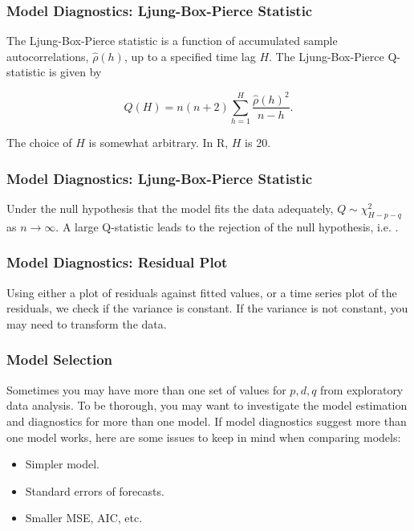 \documentclass[%
xcolor=pdftex]{beamer}
\begin{document}
\begin{frame}
\frametitle{Model Diagnostics: Ljung-Box-Pierce Statistic}

The Ljung-Box-Pierce statistic is a function of accumulated sample autocorrelations, $\hat{\rho}(h)$, up to a specified time lag $H$. The Ljung-Box-Pierce Q-statistic is given by

\begin{equation} \label{eq:ljung}
Q(H) = n(n+2) \sum_{h=1}^H \frac{\hat{\rho}(h)^2}{n-h}.
\end{equation}

The choice of $H$ is somewhat arbitrary. In R, $H$ is 20.

\end{frame}

\begin{frame}
\frametitle{Model Diagnostics: Ljung-Box-Pierce Statistic}

Under the null hypothesis that the model fits the data adequately, $Q \sim \chi^2_{H-p-q}$ as $n \to \infty$. A large Q-statistic leads to the rejection of the null hypothesis, i.e. \underline{\hspace{60 mm}} \underline{\hspace{10 mm}}.


\end{frame}

\begin{frame}
\frametitle{Model Diagnostics: Residual Plot}

Using either a plot of residuals against fitted values, or a time series plot of the residuals, we check if the variance is constant. If the variance is not constant, you may need to transform the data.


\end{frame}



\begin{frame}
\frametitle{Model Selection}

Sometimes you may have more than one set of values for $p,d,q$ from exploratory data analysis. To be thorough, you may want to investigate the model estimation and diagnostics for more than one model. If model diagnostics suggest more than one model works, here are some issues to keep in mind when comparing models:

\begin{itemize}
\item Simpler model.
\item Standard errors of forecasts.
\item Smaller MSE, AIC, etc.
\end{itemize}


\end{frame}
\end{document}
